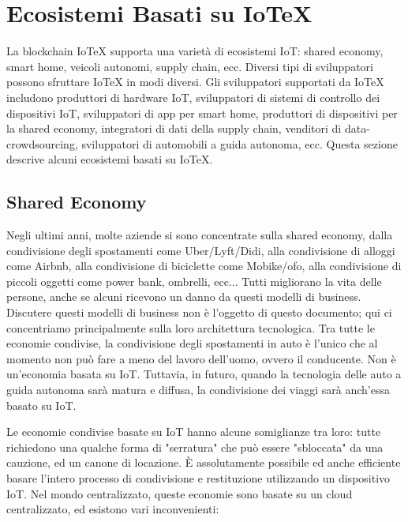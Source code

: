 \section{Ecosistemi Basati su IoTeX}

La blockchain IoTeX supporta una varietà di ecosistemi IoT: shared economy, smart home, veicoli autonomi, supply chain, ecc. Diversi tipi di sviluppatori possono sfruttare IoTeX in modi diversi. Gli sviluppatori supportati da IoTeX includono produttori di hardware IoT, sviluppatori di sistemi di controllo dei dispositivi IoT, sviluppatori di app per smart home, produttori di dispositivi per la shared economy, integratori di dati della supply chain, venditori di data-crowdsourcing, sviluppatori di automobili a guida autonoma, ecc. Questa sezione descrive alcuni ecosistemi basati su IoTeX.

\subsection{Shared Economy}
Negli ultimi anni, molte aziende si sono concentrate sulla shared economy, dalla condivisione degli spostamenti come Uber/Lyft/Didi, alla condivisione di alloggi come Airbnb, alla condivisione di biciclette come Mobike/ofo, alla condivisione di piccoli oggetti come power bank, ombrelli, ecc... Tutti migliorano la vita delle persone, anche se alcuni ricevono un danno da questi modelli di business. Discutere questi modelli di business non è l'oggetto di questo documento; qui ci concentriamo principalmente sulla loro architettura tecnologica. Tra tutte le economie condivise, la condivisione degli spostamenti in auto è l'unico che al momento non può fare a meno del lavoro dell'uomo, ovvero il conducente. Non è un'economia basata su IoT. Tuttavia, in futuro, quando la tecnologia delle auto a guida autonoma sarà matura e diffusa, la condivisione dei viaggi sarà anch'essa basato su IoT.

Le economie condivise basate su IoT hanno alcune somiglianze tra loro: tutte richiedono una qualche forma di "serratura" che può essere "sbloccata" da una cauzione, ed un canone di locazione. È assolutamente possibile ed anche efficiente basare l'intero processo di condivisione e restituzione utilizzando un dispositivo IoT. Nel mondo centralizzato, queste economie sono basate su un cloud centralizzato, ed esistono vari inconvenienti:

